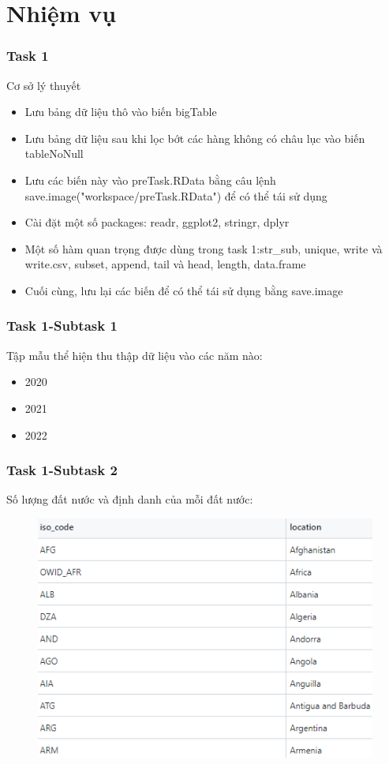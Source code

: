 \documentclass[english,10pt,table]{beamer}
\begin{document}
\section{Nhiệm vụ}
\frame
{
    \frametitle{Task 1}
    \begin{block}{Cơ sở lý thuyết}
    \begin{itemize}
        \item Lưu bảng dữ liệu thô vào biến bigTable
        \item Lưu bảng dữ liệu sau khi lọc bớt các hàng không có châu lục vào biến tableNoNull
        \item Lưu các biến này vào preTask.RData bằng câu lệnh save.image("workspace/preTask.RData") để có thể tái sử dụng
        \item Cài đặt một số packages: readr, ggplot2, stringr, dplyr
        \item Một số hàm quan trọng được dùng trong task 1:str\_sub, unique, write và write.csv, subset, append, tail và head, length, data.frame
        \item Cuối cùng, lưu lại các biến để có thể tái sử dụng bằng save.image
    \end{itemize}
    \end{block}
}
\frame
{
    \frametitle{Task 1-Subtask 1}
    \begin{block}{Tập mẫu thể hiện thu thập dữ liệu vào các năm nào:}
    \begin{itemize}
        \item 2020
        \item 2021
        \item 2022
    \end{itemize}
    \end{block}
}
\frame
{
    \frametitle{Task 1-Subtask 2}
    \begin{block}{Số lượng đất nước và định danh của mỗi đất nước:}
    \begin{figure}[H]
        \centering
        \includegraphics[scale=0.7]{images/1.2.png}
    \end{figure}
    \end{block}
}
\end{document}
